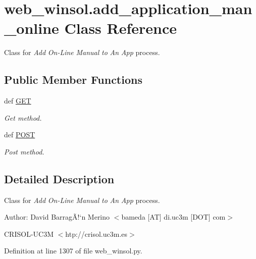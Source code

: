 \hypertarget{classweb__winsol_1_1add__application__man__online}{
\section{web\_\-winsol.add\_\-application\_\-man\_\-online Class Reference}
\label{classweb__winsol_1_1add__application__man__online}
}
Class for {\em Add\/} {\em On-Line\/} {\em Manual\/} {\em to\/} {\em An\/} {\em App\/} process.  


\subsection*{Public Member Functions}
\begin{CompactItemize}
\item 
def \hyperlink{classweb__winsol_1_1add__application__man__online_3459d36b0931656aaa284c8bc5dbda54}{GET}
\begin{CompactList}\small\item\em Get method. \item\end{CompactList}\item 
def \hyperlink{classweb__winsol_1_1add__application__man__online_b1582e9918f3a88e7caa44d111806f8b}{POST}
\begin{CompactList}\small\item\em Post method. \item\end{CompactList}\end{CompactItemize}


\subsection{Detailed Description}
Class for {\em Add\/} {\em On-Line\/} {\em Manual\/} {\em to\/} {\em An\/} {\em App\/} process. 

\begin{Desc}
\item[Author:]David Barrag\~{A}!`n Merino $<$bameda \mbox{[}AT\mbox{]} di.uc3m \mbox{[}DOT\mbox{]} com$>$ 

CRISOL-UC3M $<$htp://crisol.uc3m.es$>$ \end{Desc}




Definition at line 1307 of file web\_\-winsol.py.

